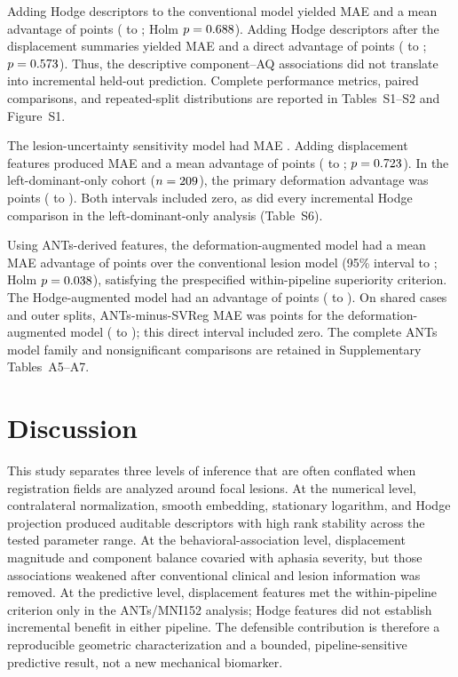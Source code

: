 \documentclass[11pt]{article}
\begin{document}
Adding Hodge descriptors to the conventional model yielded MAE \HodgeMAE{} and
a mean advantage of \HodgeAdvantage{} points (\HodgeCILow{} to
\HodgeCIHigh{}; Holm $p=0.688$). Adding Hodge descriptors after the
displacement summaries yielded MAE \DeformationHodgeMAE{} and a direct
advantage of \HodgeAfterDeformationAdvantage{} points
(\HodgeAfterDeformationCILow{} to \HodgeAfterDeformationCIHigh{}; $p=
0.573$). Thus, the descriptive component--AQ associations did
not translate into incremental held-out prediction. Complete performance
metrics, paired comparisons, and repeated-split distributions are reported in
Tables~S1--S2 and Figure~S1.

The lesion-uncertainty sensitivity model had MAE \UncertaintyMAE{}. Adding
displacement features produced MAE \CombinedMAE{} and a mean advantage of
\AfterUncertaintyAdvantage{} points (\AfterUncertaintyCILow{} to
\AfterUncertaintyCIHigh{}; $p=0.723$). In the left-dominant-only
cohort ($n=209$), the primary deformation advantage was
\LeftOnlyDeformationAdvantage{} points (\LeftOnlyDeformationCILow{} to
\LeftOnlyDeformationCIHigh{}). Both intervals included zero, as did every
incremental Hodge comparison in the left-dominant-only analysis (Table~S6).

Using ANTs-derived features, the deformation-augmented model had a mean MAE
advantage of \AntsDeformationAdvantage{} points over the conventional lesion
model (95\% interval \AntsDeformationCILow{} to
\AntsDeformationCIHigh{}; Holm $p=0.038$), satisfying the
prespecified within-pipeline superiority criterion. The Hodge-augmented model had an advantage of
\AntsHodgeAdvantage{} points (\AntsHodgeCILow{} to \AntsHodgeCIHigh{}).
On shared cases and outer splits, ANTs-minus-SVReg MAE was
\AntsVsSvregDeformationDifference{} points for the deformation-augmented model
(\AntsVsSvregDeformationCILow{} to \AntsVsSvregDeformationCIHigh{}); this
direct interval included zero. The
complete ANTs model family and nonsignificant comparisons are retained in
Supplementary Tables~A5--A7.

\section{Discussion}

This study separates three levels of inference that are often conflated when
registration fields are analyzed around focal lesions. At the numerical level,
contralateral normalization, smooth embedding, stationary logarithm, and Hodge
projection produced auditable descriptors with high rank stability across the
tested parameter range. At the behavioral-association level, displacement
magnitude and component balance covaried with aphasia severity, but those
associations weakened after conventional clinical and lesion information was
removed. At the predictive level, displacement features met the within-pipeline
criterion only in the ANTs/MNI152 analysis; Hodge features did not establish
incremental benefit in either pipeline. The defensible contribution is
therefore a reproducible geometric characterization and a bounded,
pipeline-sensitive predictive result, not a new mechanical biomarker.
\end{document}
